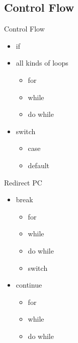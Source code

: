 \subsection{Control Flow}

\begin{frame}{Control Flow}
    \begin{itemize}
        \item if
        \item all kinds of loops
        \begin{itemize}
            \item for
            \item while
            \item do while
        \end{itemize}
        \item switch
        \begin{itemize}
            \item case
            \item default
        \end{itemize}
    \end{itemize}
\end{frame}

\begin{frame}{Redirect PC}
    \begin{itemize}
        \item break
        \begin{itemize}
            \item for
            \item while
            \item do while
            \item switch
        \end{itemize}
        \item continue
        \begin{itemize}
            \item for
            \item while
            \item do while
        \end{itemize}
    \end{itemize}
\end{frame}
